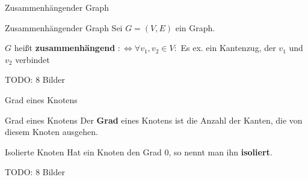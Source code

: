 \begin{frame}{Zusammenhängender Graph}
\begin{block}{Zusammenhängender Graph}
Sei $G = (V, E)$ ein Graph.

$G$ heißt \textbf{zusammenhängend} $:\Leftrightarrow \forall v_1, v_2 \in V: $ Es ex. ein Kantenzug, der $v_1$ und $v_2$ verbindet
\end{block}

TODO: 8 Bilder
\end{frame}

\begin{frame}{Grad eines Knotens}
\begin{block}{Grad eines Knotens}
Der \textbf{Grad} eines Knotens ist die Anzahl der Kanten, die von diesem Knoten
ausgehen.
\end{block}

\begin{block}{Isolierte Knoten}
Hat ein Knoten den Grad 0, so nennt man ihn \textbf{isoliert}.
\end{block}

TODO: 8 Bilder
\end{frame}
